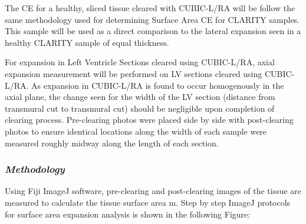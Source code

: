 The CE for a healthy, sliced tissue cleared with CUBIC-L/RA will be follow the same methodology used for determining Surface Area CE for CLARITY samples. This sample will be used as a direct comparison to the lateral expansion seen in a healthy CLARITY sample of equal thickness. 

For expansion in Left Ventricle Sections cleared using CUBIC-L/RA, axial expansion measurement will be performed on LV sections cleared using CUBIC-L/RA. As expansion in CUBIC-L/RA is found to occur homogenously in the axial plane, the change seen for the width of the LV section (distance from transmural cut to transmural cut) should be negligible upon completion of clearing process. Pre-clearing photos were placed side by side with post-clearing photos to ensure identical locations along the width of each sample were measured roughly midway along the length of each section.

\subsubsection{\textit{Methodology}}

Using Fiji ImageJ software, pre-clearing and post-clearing images of the tissue are measured to calculate the tissue surface area m. Step by step ImageJ protocols for surface area expansion analysis is shown in the following Figure: 

